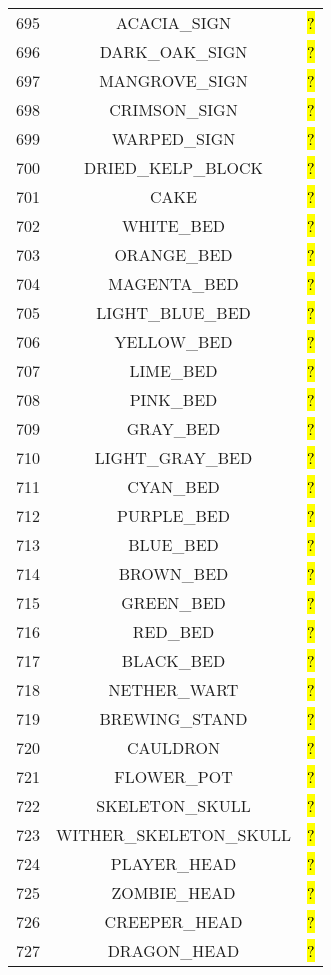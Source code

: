 \documentclass[11pt]{article}
\newcommand\myworries[1]{\sethlcolor{red}\hl{#1}}
\begin{document}
\begin{longtable}{ |c|c|c| }
	695 & ACACIA\_SIGN & \myworries{?} \\
	696 & DARK\_OAK\_SIGN & \myworries{?} \\
	697 & MANGROVE\_SIGN & \myworries{?} \\
	698 & CRIMSON\_SIGN & \myworries{?} \\
	699 & WARPED\_SIGN & \myworries{?} \\
	700 & DRIED\_KELP\_BLOCK & \myworries{?} \\
	701 & CAKE & \myworries{?} \\
	702 & WHITE\_BED & \myworries{?} \\
	703 & ORANGE\_BED & \myworries{?} \\
	704 & MAGENTA\_BED & \myworries{?} \\
	705 & LIGHT\_BLUE\_BED & \myworries{?} \\
	706 & YELLOW\_BED & \myworries{?} \\
	707 & LIME\_BED & \myworries{?} \\
	708 & PINK\_BED & \myworries{?} \\
	709 & GRAY\_BED & \myworries{?} \\
	710 & LIGHT\_GRAY\_BED & \myworries{?} \\
	711 & CYAN\_BED & \myworries{?} \\
	712 & PURPLE\_BED & \myworries{?} \\
	713 & BLUE\_BED & \myworries{?} \\
	714 & BROWN\_BED & \myworries{?} \\
	715 & GREEN\_BED & \myworries{?} \\
	716 & RED\_BED & \myworries{?} \\
	717 & BLACK\_BED & \myworries{?} \\
	718 & NETHER\_WART & \myworries{?} \\
	719 & BREWING\_STAND & \myworries{?} \\
	720 & CAULDRON & \myworries{?} \\
	721 & FLOWER\_POT & \myworries{?} \\
	722 & SKELETON\_SKULL & \myworries{?} \\
	723 & WITHER\_SKELETON\_SKULL & \myworries{?} \\
	724 & PLAYER\_HEAD & \myworries{?} \\
	725 & ZOMBIE\_HEAD & \myworries{?} \\
	726 & CREEPER\_HEAD & \myworries{?} \\
	727 & DRAGON\_HEAD & \myworries{?} \\

\end{longtable}
\end{document}

